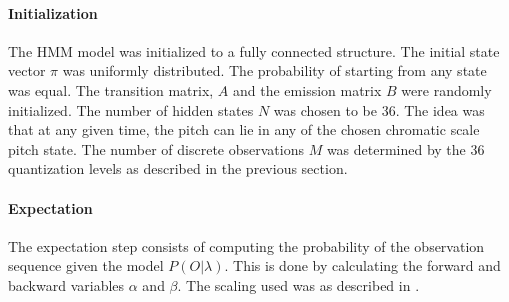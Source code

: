 \documentclass[letterpaper, 10 pt, conference]{ieeeconf}  %
\begin{document}
\paragraph{Initialization}
The HMM model was initialized to a fully connected structure. The initial state vector $\pi$ was uniformly distributed. The probability of starting from any state was equal. The transition matrix, $A$ and the emission matrix $B$ were randomly initialized. The number of hidden states $N$ was chosen to be 36. The idea was that at any given time, the pitch can lie in any of the chosen chromatic scale pitch state. The number of discrete observations $M$ was determined by the 36 quantization levels as described in the previous section. \\

\paragraph{Expectation}
The expectation step consists of computing the probability of the observation sequence given the model $P(O|\lambda)$. This is done by calculating the forward and backward variables $\alpha$ and $\beta$. The scaling used was as described in \cite{c1}.
\end{document}
